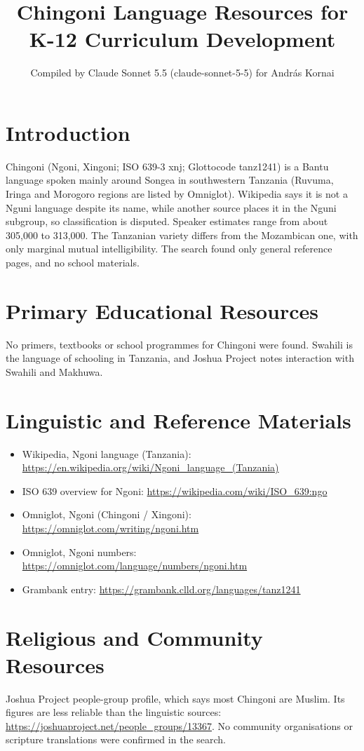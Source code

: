 \documentclass[12pt]{article}
\title{Chingoni Language Resources for K-12 Curriculum Development}
\author{Compiled by Claude Sonnet 5.5 (claude-sonnet-5-5) for Andr\'as Kornai}
\date{}
\begin{document}
\maketitle

\section{Introduction}
Chingoni (Ngoni, Xingoni; ISO 639-3 xnj; Glottocode tanz1241) is a Bantu language spoken mainly around Songea in southwestern Tanzania (Ruvuma, Iringa and Morogoro regions are listed by Omniglot). Wikipedia says it is not a Nguni language despite its name, while another source places it in the Nguni subgroup, so classification is disputed. Speaker estimates range from about 305,000 to 313,000. The Tanzanian variety differs from the Mozambican one, with only marginal mutual intelligibility. The search found only general reference pages, and no school materials.

\section{Primary Educational Resources}
No primers, textbooks or school programmes for Chingoni were found. Swahili is the language of schooling in Tanzania, and Joshua Project notes interaction with Swahili and Makhuwa.

\section{Linguistic and Reference Materials}
\begin{itemize}
\item Wikipedia, Ngoni language (Tanzania): \url{https://en.wikipedia.org/wiki/Ngoni_language_(Tanzania)}
\item ISO 639 overview for Ngoni: \url{https://wikipedia.com/wiki/ISO_639:ngo}
\item Omniglot, Ngoni (Chingoni / Xingoni): \url{https://omniglot.com/writing/ngoni.htm}
\item Omniglot, Ngoni numbers: \url{https://omniglot.com/language/numbers/ngoni.htm}
\item Grambank entry: \url{https://grambank.clld.org/languages/tanz1241}
\end{itemize}

\section{Religious and Community Resources}
Joshua Project people-group profile, which says most Chingoni are Muslim. Its figures are less reliable than the linguistic sources: \url{https://joshuaproject.net/people_groups/13367}. No community organisations or scripture translations were confirmed in the search.
\end{document}
